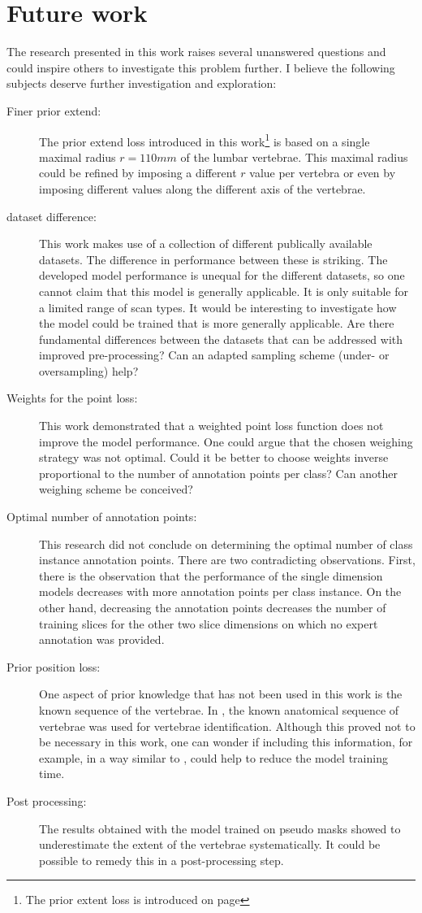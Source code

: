 \chapter{Future work}
The research presented in this work raises several unanswered questions and could inspire others to investigate this problem further.
I believe the following subjects deserve further investigation and exploration:
\begin{description}
    \item[Finer prior extend:] The prior extend loss introduced in this work\footnote{The prior extent loss is introduced on page \pageref{fig:prior_extent}} is based on a single maximal radius $r=110mm$ 
    of the lumbar vertebrae. This maximal radius could be refined by imposing a different $r$ value per vertebra or even by imposing different values along the different axis of the vertebrae.
    \item[dataset difference:] This work makes use of a collection of different publically available datasets. The difference in performance between these is striking.
    The developed model performance is unequal for the different datasets, so one cannot claim that this model is generally applicable. It is only suitable for a limited range of scan types.
    It would be interesting to investigate how the model could be trained that is more generally applicable. Are there fundamental differences between the datasets that can be addressed with improved pre-processing?
    Can an adapted sampling scheme (under- or oversampling) help? 
    \item[Weights for the point loss:] This work demonstrated that a weighted point loss function does not improve the model performance. One could argue that the chosen weighing strategy was not optimal.
    Could it be better to choose weights inverse proportional to the number of annotation points per class? Can another weighing scheme be conceived? 
    \item[Optimal number of annotation points:] This research did not conclude on determining the optimal number of class instance annotation points. There are two contradicting observations.
    First, there is the observation that the performance of the single dimension models decreases with more annotation points per class instance. 
    On the other hand, decreasing the annotation points decreases the number of training slices for the other two slice dimensions on which no expert annotation was provided.
    \item[Prior position loss:] One aspect of prior knowledge that has not been used in this work is the known sequence of the vertebrae. In \cite{Lessmann2018}, 
    the known anatomical sequence of vertebrae was used for vertebrae identification.
    Although this proved not to be necessary in this work, one can wonder if including this information, for example, in a way similar to \cite{Lessmann2018}, could help to reduce the model training time.
    \item[Post processing:] The results obtained with the model trained on pseudo masks showed to underestimate the extent of the vertebrae systematically.
    It could be possible to remedy this in a post-processing step. 
\end{description}